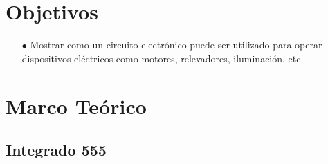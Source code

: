 \documentclass[osajnl,twocolumn,showpacs,superscriptaddress,10pt]{revtex4-1}
\begin{document}
\section{Objetivos}

    


\begin{itemize}
    \item[$\bullet$] Mostrar como un circuito electrónico puede ser utilizado para operar dispositivos eléctricos como motores, relevadores, iluminación, etc.
\end{itemize}


 
 
\section{Marco Teórico}

    
\subsection{Integrado 555}
\end{document}

